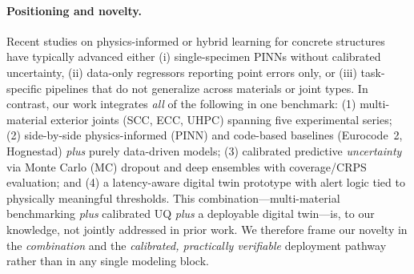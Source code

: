 \documentclass{article}
\begin{document}
\paragraph{Positioning and novelty.}
Recent studies on physics-informed or hybrid learning for concrete structures have typically advanced either 
(i) single-specimen PINNs without calibrated uncertainty,
(ii) data-only regressors reporting point errors only, or 
(iii) task-specific pipelines that do not generalize across materials or joint types.  
In contrast, our work integrates \emph{all} of the following in one benchmark:
(1) multi-material exterior joints (SCC, ECC, UHPC) spanning five experimental series;
(2) side-by-side physics-informed (PINN) and code-based baselines (Eurocode~2, Hognestad) \emph{plus} purely data-driven models;
(3) calibrated predictive \emph{uncertainty} via Monte Carlo (MC) dropout and deep ensembles with coverage/CRPS evaluation; and
(4) a latency-aware digital twin prototype with alert logic tied to physically meaningful thresholds.
This combination—multi-material benchmarking \emph{plus} calibrated UQ \emph{plus} a deployable digital twin—is, to our knowledge, not jointly addressed in prior work.
We therefore frame our novelty in the \emph{combination} and the \emph{calibrated, practically verifiable} deployment pathway rather than in any single modeling block.
\end{document}
